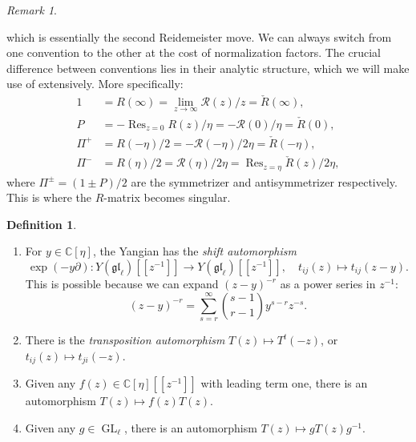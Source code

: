 \documentclass[11pt]{report}
\theoremstyle{definition}
\newtheorem{definition}[theorem]{Definition}
\theoremstyle{remark}
\newtheorem*{remark}{Remark}
\theoremstyle{remark}
\newcommand{\C}{\mathbb{C}}
\begin{document}
\begin{remark}
\begin{center}
\end{center}
which is essentially the second Reidemeister move. We can always switch from one convention to the other at the cost of normalization factors. The crucial difference between conventions lies in their analytic structure, which we will make use of extensively. More specifically:
\begin{align*}
1 &= R(\infty) = \lim_{z \to \infty} \mathcal{R}(z)/z = \check R(\infty), \\
P &= -\operatorname{Res}_{z=0} R(z)/\eta = -\mathcal{R}(0)/\eta = \check R(0), \\
\Pi^+ &= R(-\eta)/2 = -\mathcal{R}(-\eta)/2\eta = \check R(-\eta), \\
\Pi^- &= R(\eta)/2 = \mathcal{R}(\eta)/2\eta = \operatorname{Res}_{z=\eta} \check R(z)/2\eta,
\end{align*}
where $\Pi^\pm = (1 \pm P)/2$ are the symmetrizer and antisymmetrizer respectively. This is where the $R$-matrix becomes singular.
\end{remark}

\begin{definition}
\begin{enumerate}[label=(\roman*)]
\item For $y \in \C[\eta]$, the Yangian has the \emph{shift automorphism}
\begin{equation*}
\exp(-y\partial): Y(\mathfrak{gl}_\ell)[[z^{-1}]] \to Y(\mathfrak{gl}_\ell)[[z^{-1}]], \quad t_{ij}(z) \mapsto t_{ij}(z-y).
\end{equation*}
This is possible because we can expand $(z-y)^{-r}$ as a power series in $z^{-1}$:
\begin{equation*}
(z-y)^{-r} = \sum_{s=r}^\infty {s-1 \choose r-1} y^{s-r} z^{-s}.
\end{equation*}
\item There is the \emph{transposition automorphism} $T(z) \mapsto T^t(-z)$, or $t_{ij}(z) \mapsto t_{ji}(-z)$.
\item Given any $f(z) \in \C[\eta][[z^{-1}]]$ with leading term one, there is an automorphism $T(z) \mapsto f(z) T(z)$.
\item Given any $g \in \operatorname{GL}_\ell$, there is an automorphism $T(z) \mapsto g T(z) g^{-1}$.
\end{enumerate}
\end{definition}
 
\end{document}
